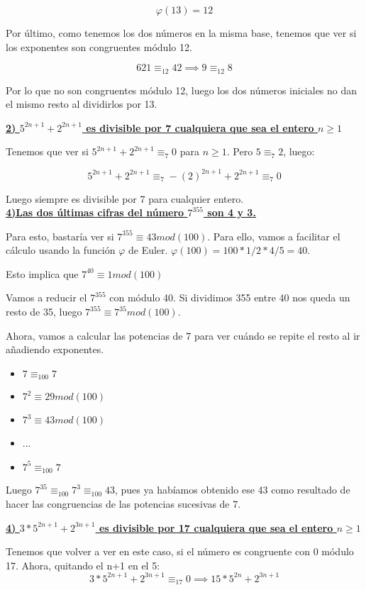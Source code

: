\documentclass[11pt, a4paper, titlepage]{article}
\begin{document}
\[
\varphi(13) = 12
\]

Por último, como tenemos los dos números en la misma base, tenemos que ver si los exponentes son congruentes módulo 12.

\[
621 \equiv_{12} 42 \implies 9 \equiv_{12} 8
\]

Por lo que no son congruentes módulo 12, luego los dos números iniciales no dan el mismo resto al dividirlos por 13.

\textbf{\underline{2) $5^{2n+1} + 2^{2n+1}$ es divisible por 7 cualquiera que sea el entero $n \geq 1$}}

Tenemos que ver si $5^{2n+1} + 2^{2n+1} \equiv_7 0$ para $n\geq 1$. Pero $5\equiv_7 2$, luego:

\[
5^{2n+1} + 2^{2n+1} \equiv_7 -(2)^{2n+1} + 2^{2n+1} \equiv_7 0
\]

Luego siempre es divisible por 7 para cualquier entero.\\


\underline{\textbf{4)Las dos últimas cifras del número $7^{355}$ son 4 y 3.}}

Para esto, bastaría ver si $7^{355} \equiv 43 mod(100)$. Para ello, vamos a facilitar el cálculo usando la función $\varphi$ de Euler. $\varphi(100) = 100*1/2 * 4/5 = 40$.

Esto implica que $ 7^{40} \equiv 1 mod(100)$

Vamos a reducir el $7^{355}$ con módulo 40. Si dividimos 355 entre 40 nos queda un resto de 35, luego $7^{355} \equiv 7^{35} mod(100)$.

Ahora, vamos a calcular las potencias de 7 para ver cuándo se repite el resto al ir añadiendo exponentes.
\begin{itemize}
	\item $7 \equiv_{100} 7$
	\item $7^2 \equiv 29 mod(100)$
	\item $7^3 \equiv 43 mod(100)$
	\item ...
	\item $7^5 \equiv_{100} 7$
\end{itemize}

Luego $7^{35} \equiv_{100} 7^3 \equiv_{100} 43$, pues ya habíamos obtenido ese 43 como resultado de hacer las congruencias de las potencias sucesivas de 7.


\underline{\textbf{4) $3*5^{2n+1} + 2^{3n+1}$ es divisible por 17 cualquiera que sea el entero $n\geq 1$}}

Tenemos que volver a ver en este caso, si el número es congruente con 0 módulo 17.
Ahora, quitando el n+1 en el 5:
\[
3*5^{2n+1} + 2^{3n+1} \equiv_{17} 0  \implies 15*5^{2n} + 2^{3n+1}
\]
\end{document}
